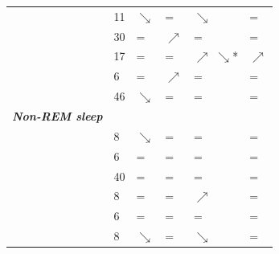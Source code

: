 \begin{table}[!htb]
{\begin{tabularx}{\textwidth}{Xlllll}
	\citealp{esposito_reduced_2004}     & 11         	& {\color[HTML]{3166FF} $\searrow$} & =                        			& {\color[HTML]{3166FF} $\searrow$}   									& =                               		\\
	\citealp{marzano_recalling_2011}    & 30         	& =                        			& {\color[HTML]{FE0000} $\nearrow$} & =                          											& =                               		\\
	\citealp{chellappa_cortical_2011}   & 17         	& =                        			& {\color[HTML]{000000} =} 			& {\color[HTML]{FE0000} $\nearrow$}{\color[HTML]{3166FF} $\searrow$}* 	& {\color[HTML]{FE0000} $\nearrow$}     \\
	\citealp{scarpelli_state-_2015}     & 6          	& =                        			& {\color[HTML]{FE0000} $\nearrow$} & =                          											& =                               		\\
	\citealp{siclari_neural_2017}       & 46         	& {\color[HTML]{3166FF} $\searrow$} & =                        			& =                          											& =                               		\\
	\smallskip
	\textbf{\textit{Non-REM sleep}} & & & & & \\
	\citealp{moffitt_individual_1982}   & 8          	& {\color[HTML]{3166FF} $\searrow$} & =                        			& =                          											& =                               		\\
	\citealp{williamson_spectral_1986}  & 6          	& =                        			& =                        			& =                          											& =                               		\\
	\citealp{morel_electrophysiological_1991} & 40      & =                        			& =                        			& =                          											& =                               		\\
	\citealp{takeuchi_eeg_2003}         & 8          	& =                        			& =                        			& {\color[HTML]{FE0000} $\nearrow$}   									& =                               		\\
	\citealp{wittmann_nrem_2004}        & 6          	& =                        			& =                        			& =                          											& =                               		\\
	\citealp{esposito_reduced_2004}     & 8          	& {\color[HTML]{3166FF} $\searrow$} & =                        			& {\color[HTML]{3166FF} $\searrow$}   									& =                               		\\

\end{tabularx}}
\end{table}
